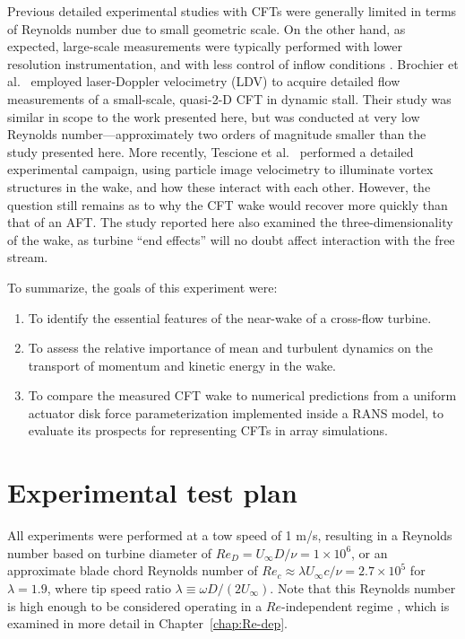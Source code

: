 Previous detailed experimental studies with CFTs were generally limited in terms
of Reynolds number due to small geometric scale. On the other hand, as expected,
large-scale measurements were typically performed with lower resolution
instrumentation, and with less control of inflow conditions
\cite{Vermeulen1979}. Brochier et al.~\cite{Brochier1986} employed laser-Doppler
velocimetry (LDV) to acquire detailed flow measurements of a small-scale,
quasi-2-D CFT in dynamic stall. Their study was similar in scope to the work
presented here, but was conducted at very low Reynolds number---approximately
two orders of magnitude smaller than the study presented here. More recently,
Tescione et al.~\cite{Tescione2014} performed a detailed experimental campaign,
using particle image velocimetry to illuminate vortex structures in the wake,
and how these interact with each other. However, the question still remains as
to why the CFT wake would recover more quickly than that of an AFT. The study
reported here also examined the three-dimensionality of the wake, as turbine
``end effects'' will no doubt affect interaction with the free stream.

To summarize, the goals of this experiment were:
\begin{enumerate}
    \item To identify the essential features of the near-wake of a cross-flow
    turbine.
    
    \item To assess the relative importance of mean and turbulent dynamics on the
    transport of momentum and kinetic energy in the wake.
    
    \item To compare the measured CFT wake to numerical predictions from a
    uniform actuator disk force parameterization implemented inside a RANS
    model, to evaluate its prospects for representing CFTs in array simulations.
\end{enumerate}


\section{Experimental test plan}

All experiments were performed at a tow speed of 1 m/s, resulting in a Reynolds
number based on turbine diameter of $Re_D = U_\infty D /\nu = 1 \times 10^6$, or
an approximate blade chord Reynolds number of $Re_c \approx \lambda U_\infty
c/\nu = 2.7 \times 10^5$ for $\lambda=1.9$, where tip speed ratio $\lambda
\equiv \omega D / (2 U_\infty)$. Note that this Reynolds number is high enough
to be considered operating in a $Re$-independent regime \cite{Bravo2007,
    Bachant2014, Bachant2016-Energies}, which is examined in more detail in
Chapter~\ref{chap:Re-dep}.


